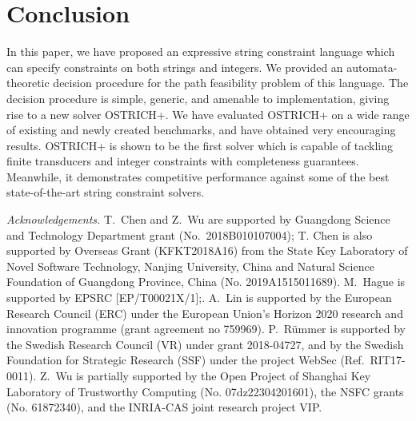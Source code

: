 \documentclass{llncs}
\begin{document}


\vspace{-3mm}
\section{Conclusion} \label{sec:conc}

In this paper, we have proposed  an expressive string constraint language which can specify constraints on both strings and integers.  We provided an automata-theoretic decision procedure for the path feasibility problem of this language. The decision procedure is simple, generic, and amenable to implementation, giving rise to a new solver OSTRICH+.  We have evaluated OSTRICH+ on  a wide range of existing and newly created benchmarks, and have obtained very encouraging results.  OSTRICH+ is shown to be the first solver  which is capable of tackling finite transducers and integer constraints with completeness guarantees. Meanwhile, it demonstrates competitive performance against some of the best state-of-the-art string constraint solvers.


\medskip
\small{
\noindent \emph{Acknowledgements.}  
T.~Chen and Z.~Wu are supported by Guangdong Science and Technology Department grant (No.\ 2018B010107004); T. Chen is also supported by Overseas Grant (KFKT2018A16) from the State Key Laboratory of
Novel Software Technology, Nanjing University, China and Natural Science Foundation of Guangdong Province, China (No. 2019A1515011689).
M.~Hague is supported by EPSRC [EP/T00021X/1];.
A.~Lin is supported by the European Research Council (ERC) under the European
Union's Horizon 2020 research and innovation programme (grant agreement no
759969).
P.~R\"ummer is supported by the
Swedish Research Council (VR) under grant 2018-04727, and by the
Swedish Foundation for Strategic Research (SSF) under the project
WebSec (Ref.\ RIT17-0011).
Z.~Wu is partially supported by  the Open Project of Shanghai Key Laboratory of Trustworthy Computing (No. 07dz22304201601), the NSFC grants (No. 61872340), and the INRIA-CAS joint research project VIP.   
}

\vspace{-3mm}




\iftoggle{full}
{
\newpage
\begin{appendix}

\end{appendix}
}
{}%
\end{document}
